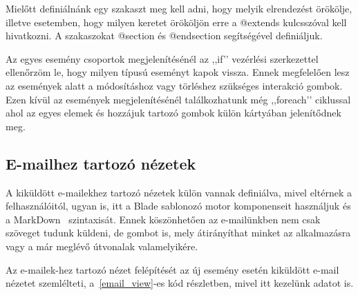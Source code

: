 \documentclass[
]{thesis-ekf}
\theoremstyle{definition}
\theoremstyle{remark}
\begin{document}
	Mielőtt definiálnánk egy szakaszt meg kell adni, hogy melyik elrendezést örökölje, illetve esetemben, hogy milyen keretet örököljön erre a @extends kulcsszóval kell hivatkozni. A szakaszokat @section és @endsection segítségével definiáljuk.
	
	Az egyes esemény csoportok megjelenítésénél az ,,if’’ vezérlési szerkezettel ellenőrzöm le, hogy milyen típusú eseményt kapok vissza. Ennek megfelelően lesz az események alatt a módosításhoz vagy törléshez szükséges interakció gombok. Ezen kívül az események megjelenítésénél találkozhatunk még ,,foreach’’ ciklussal ahol az egyes elemek és hozzájuk tartozó gombok külön kártyában jelenítődnek meg. 
	
	\subsection{E-mailhez tartozó nézetek}
	A kiküldött e-mailekhez tartozó nézetek külön vannak definiálva, mivel eltérnek a felhasználóitól, ugyan is, itt a Blade sablonozó motor komponenseit használjuk és a MarkDown~\cite{markdown_page} szintaxisát. Ennek köszönhetően az e-mailünkben nem csak szöveget tudunk küldeni, de gombot is, mely átirányíthat minket az alkalmazásra vagy a már meglévő útvonalak valamelyikére.
	
	Az e-mailek-hez tartozó nézet felépítését az új esemény esetén kiküldött e-mail nézetet szemlélteti, a~\ref{email_view}-es kód részletben, mivel itt kezelünk adatot is. 
	
	
	
\end{document}
